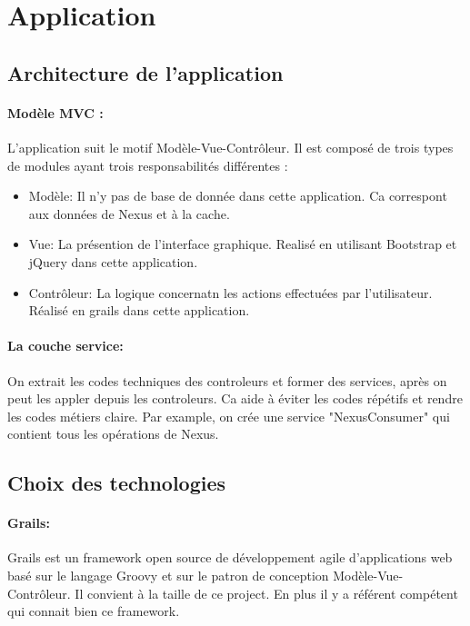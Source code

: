 \section{Application}

\subsection{Architecture de l'application}

\paragraph{Modèle MVC :}
L'application suit le motif Modèle-Vue-Contrôleur.
Il est composé de  trois types de modules ayant trois responsabilités différentes :
\begin{itemize}
 \item Modèle: Il n'y pas de base de donnée dans cette application. Ca correspont aux données de Nexus et à la cache.
 \item Vue: La présention de l'interface graphique. Realisé en utilisant Bootstrap et jQuery dans cette application.
 \item Contrôleur: La logique concernatn les actions effectuées par l'utilisateur. Réalisé en grails dans cette application.
\end{itemize}

\paragraph{La couche service:}
On extrait les codes techniques des controleurs et former des services, après on peut les appler depuis les controleurs.
Ca aide à éviter les codes répétifs et rendre les codes métiers claire.
Par example, on crée une service "NexusConsumer" qui contient tous les opérations de Nexus.

\subsection{Choix des technologies}

\paragraph{Grails:}
Grails est un framework open source de développement agile d'applications web basé sur le langage Groovy et sur le patron de conception Modèle-Vue-Contrôleur.
Il convient à la taille de ce project. En plus il y a référent compétent qui connait bien ce framework.
